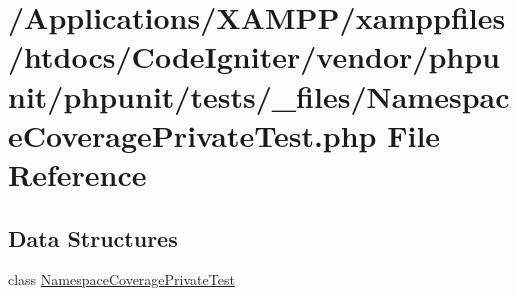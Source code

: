 \hypertarget{phpunit_2tests_2__files_2_namespace_coverage_private_test_8php}{}\section{/\+Applications/\+X\+A\+M\+P\+P/xamppfiles/htdocs/\+Code\+Igniter/vendor/phpunit/phpunit/tests/\+\_\+files/\+Namespace\+Coverage\+Private\+Test.php File Reference}
\label{phpunit_2tests_2__files_2_namespace_coverage_private_test_8php}
\subsection*{Data Structures}
\begin{DoxyCompactItemize}
\item 
class \mbox{\hyperlink{class_namespace_coverage_private_test}{Namespace\+Coverage\+Private\+Test}}
\end{DoxyCompactItemize}
